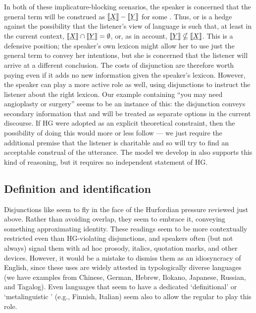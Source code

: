 \documentclass{article}
\begin{document}
In both of these implicature-blocking scenarios, the speaker is
concerned that the general term  will be construed as
$\llbracket\emph{X}\rrbracket-\llbracket\emph{Y}\rrbracket$ for some . Thus,  or
 is a hedge against the possibility that the listener's view
of language is such that, at least in the current context,
$\llbracket\emph{X}\rrbracket \cap \llbracket\emph{Y}\rrbracket = \emptyset$, or, as in
 account,
$\llbracket\emph{Y}\rrbracket \nsubseteq \llbracket\emph{X}\rrbracket$. This is a defensive
position; the speaker's own lexicon might allow her to use just the
general term to convey her intentions, but she is concerned that the
listener will arrive at a different conclusion. The costs of
disjunction are therefore worth paying even if it adds no new
information given the speaker's lexicon.  However, the speaker can
play a more active role as well, using disjunctions to instruct the
listener about the right lexicon. Our 
example containing ``you may need angioplasty or surgery'' seems to be
an instance of this: the disjunction conveys secondary information
that  and  will be treated as separate
options in the current discourse. If HG were adopted as an explicit
theoretical constraint, then the possibility of doing this would more
or less follow --- we just require the additional premise that the
listener is charitable and so will try to find an acceptable construal
of the utterance. The model we develop in  also
supports this kind of reasoning, but it requires no independent
statement of HG.
 

\subsection{Definition and identification}\label{sec:data:definitional}


Disjunctions like  seem to fly in the
face of the Hurfordian pressure reviewed just above. Rather than
avoiding overlap, they seem to embrace it, conveying something
approximating identity. These readings seem to be more contextually
restricted even than HG-violating disjunctions, and speakers often
(but not always) signal them with ad hoc prosody, italics, quotation
marks, and other devices. However, it would be a mistake to dismiss
them as an idiosyncracy of English, since these uses are widely
attested in typologically diverse languages (we have examples from
Chinese, German, Hebrew, Ilokano, Japanese, Russian, and
Tagalog). Even languages that seem to have a dedicated `definitional'
or `metalinguistic ' (e.g., Finnish, Italian) seem also to
allow the regular  to play this role.
\end{document}
